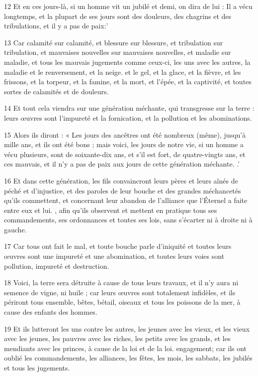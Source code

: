 \par 12 Et en ces jours-là, si un homme vit un jubilé et demi, on dira de lui : Il a vécu longtemps, et la plupart de ses jours sont des douleurs, des chagrins et des tribulations, et il y a pas de paix:'
\par 13 Car calamité sur calamité, et blessure sur blessure, et tribulation sur tribulation, et mauvaises nouvelles sur mauvaises nouvelles, et maladie sur maladie, et tous les mauvais jugements comme ceux-ci, les uns avec les autres, la maladie et le renversement, et la neige. et le gel, et la glace, et la fièvre, et les frissons, et la torpeur, et la famine, et la mort, et l'épée, et la captivité, et toutes sortes de calamités et de douleurs.
\par 14 Et tout cela viendra sur une génération méchante, qui transgresse sur la terre : leurs œuvres sont l'impureté et la fornication, et la pollution et les abominations.
\par 15 Alors ils diront : « Les jours des ancêtres ont été nombreux (même), jusqu'à mille ans, et ils ont été bons ; mais voici, les jours de notre vie, si un homme a vécu plusieurs, sont de soixante-dix ans, et s'il est fort, de quatre-vingts ans, et ces mauvais, et il n'y a pas de paix aux jours de cette génération méchante. .'
\par 16 Et dans cette génération, les fils convaincront leurs pères et leurs aînés de péché et d'injustice, et des paroles de leur bouche et des grandes méchancetés qu'ils commettent, et concernant leur abandon de l'alliance que l'Éternel a faite entre eux et lui. , afin qu'ils observent et mettent en pratique tous ses commandements, ses ordonnances et toutes ses lois, sans s'écarter ni à droite ni à gauche.
\par 17 Car tous ont fait le mal, et toute bouche parle d'iniquité et toutes leurs œuvres sont une impureté et une abomination, et toutes leurs voies sont pollution, impureté et destruction.
\par 18 Voici, la terre sera détruite à cause de tous leurs travaux, et il n'y aura ni semence de vigne, ni huile ; car leurs œuvres sont totalement infidèles, et ils périront tous ensemble, bêtes, bétail, oiseaux et tous les poissons de la mer, à cause des enfants des hommes.
\par 19 Et ils lutteront les uns contre les autres, les jeunes avec les vieux, et les vieux avec les jeunes, les pauvres avec les riches, les petits avec les grands, et les mendiants avec les princes, à cause de la loi et de la loi. engagement; car ils ont oublié les commandements, les alliances, les fêtes, les mois, les sabbats, les jubilés et tous les jugements.
